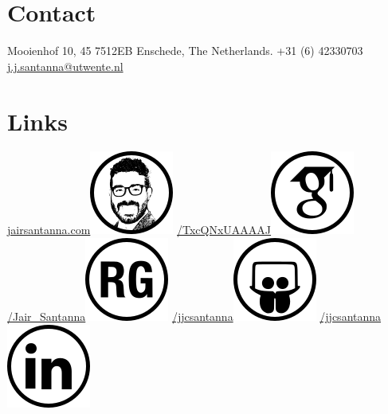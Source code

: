 \documentclass[print]{friggeri-cv-linux} %
\begin{document}

\begin{aside} 
 \section{Contact}
	Mooienhof 10, 45
	7512EB Enschede,
	The Netherlands.
	+31 (6) 42330703
	\href{mailto:j.j.santanna@utwente.nl}{j.j.santanna@utwente.nl}
~
\section{Links}
\hspace{-1cm}\href{http://www.jairsantanna.com}{jairsantanna.com}\includegraphics[scale=0.5]{img/jairsantanna.png}
\href{https://scholar.google.com/citations?user=TxcQNxUAAAAJ}{/TxcQNxUAAAAJ}\includegraphics[scale=0.3]{img/googlescholar.png}
\href{https://www.researchgate.net/profile/Jair_Santanna}{/Jair\_Santanna}\includegraphics[scale=0.3]{img/researchgate.png}
\href{http://www.slideshare.net/jjcsantanna}{/jjcsantanna}\includegraphics[scale=0.3]{img/slideshare.png}
\href{https://www.linkedin.com/in/jjcsantanna}{/jjcsantanna}\includegraphics[scale=0.3]{img/linkedin.png}

\end{aside}
\end{document}

